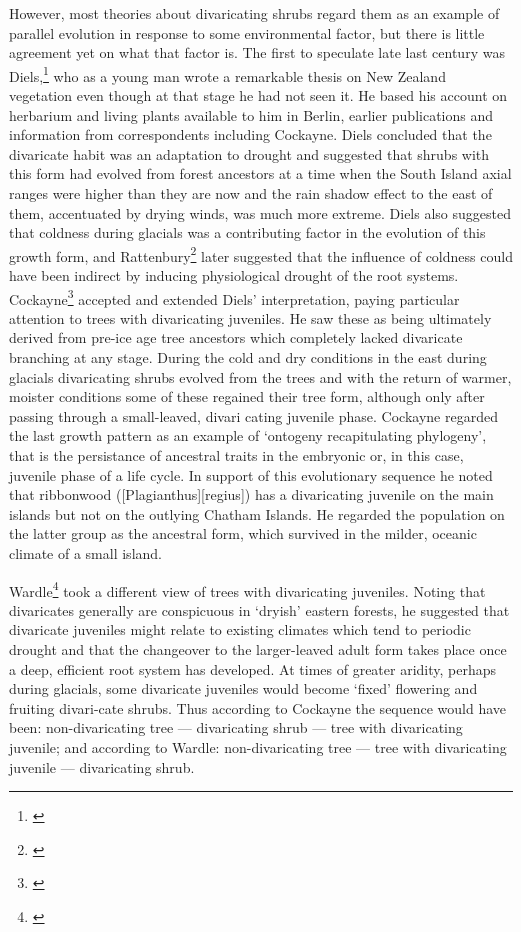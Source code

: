 However, most theories about divaricating shrubs regard them as an example of parallel evolution in response to some environmental factor, but there is little agreement yet on what that factor is.
The first to speculate late last century was Diels,\footnote{\cite{diels1897vegetations}} who as a young man wrote a remarkable thesis on New Zealand vegetation even though at that stage he had not seen it.
He based his account on herbarium and living plants available to him in Berlin, earlier publications and information from correspondents including Cockayne.
Diels concluded that the divaricate habit was an adaptation to drought and suggested that shrubs with this form had evolved from forest ancestors at a time when the South Island axial ranges were higher than they are now and the rain shadow effect to the east of them, accentuated by drying winds, was much more extreme.
Diels also suggested that coldness during glacials was a contributing factor in the evolution of this growth form, and Rattenbury\footnote{\cite{rattenbury1962cyclic}} later suggested that the influence of coldness could have been indirect by inducing physiological drought of the root systems.
Cockayne\footnote{\cite{cockayne1912observations}} accepted and extended Diels' interpretation, paying particular attention to trees with divaricating juveniles.
He saw these as being ultimately derived from pre-ice age tree ancestors which completely lacked divaricate branching at any stage.
During the cold and dry conditions in the east during glacials divaricating shrubs evolved from the trees and with the return of warmer, moister conditions some of these regained their tree form, although only after passing through a small-leaved, divari cating juvenile phase.
Cockayne regarded the last growth pattern as an example of `ontogeny recapitulating phylogeny', that is the persistance of ancestral traits in the embryonic or, in this case, juvenile phase of a life cycle.
In support of this evolutionary sequence he noted that ribbonwood ([Plagianthus][regius]) has a divaricating juvenile on the main islands but not on the outlying Chatham Islands.
He regarded the population on the latter group as the ancestral form, which survived in the milder, oceanic climate of a small island.

Wardle\footnote{\cite{wardle1963evolution}} took a different view of trees with divaricating juveniles.
Noting that divaricates generally are conspicuous in `dryish' eastern forests, he suggested that divaricate juveniles might relate to existing climates which tend to periodic drought and that the changeover to the larger-leaved adult form takes place once a deep, efficient root system has developed.
At times of greater aridity, perhaps during glacials, some divaricate juveniles would become `fixed' flowering and fruiting divari-cate shrubs.
Thus according to Cockayne the sequence would have been: non-divaricating tree --- divaricating shrub --- tree with divaricating juvenile; and according to Wardle: non-divaricating tree --- tree with divaricating juvenile --- divaricating shrub.

